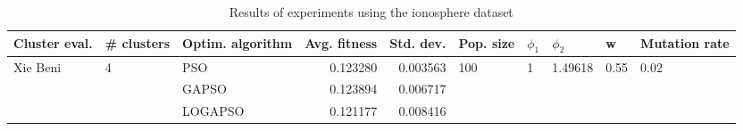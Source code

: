 \begin{table}
\centering
\caption{Results of experiments using the ionosphere dataset}
\begin{tabular}{lllrrlllll}
\toprule
            Cluster eval. &        \# clusters & Optim. algorithm &  Avg. fitness &  Std. dev. &            Pop. size &         $\phi_{1}$ &               $\phi_{2}$ &                     w &         Mutation rate \\
\midrule
\multirow{3}{*}{Xie Beni} & \multirow{3}{*}{4} &              PSO &      0.123280 &   0.003563 & \multirow{3}{*}{100} & \multirow{3}{*}{1} & \multirow{3}{*}{1.49618} & \multirow{3}{*}{0.55} & \multirow{3}{*}{0.02} \\
                          &                    &            GAPSO &      0.123894 &   0.006717 &                      &                    &                          &                       &                       \\
                          &                    &          LOGAPSO &      0.121177 &   0.008416 &                      &                    &                          &                       &                       \\
\bottomrule
\end{tabular}
\end{table}
